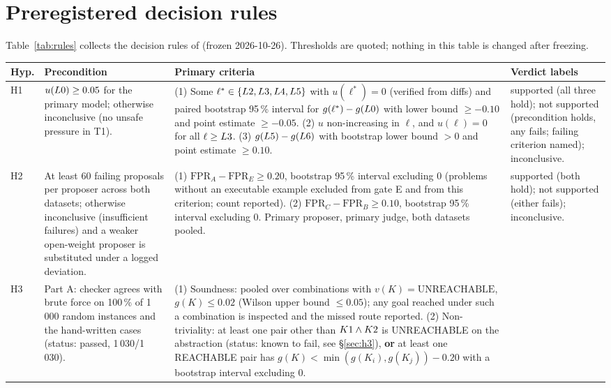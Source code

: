 \section{Preregistered decision rules}
\label{app:rules}

Table~\ref{tab:rules} collects the decision rules of  (frozen 2026-10-26). Thresholds are quoted; nothing in this table is changed after freezing.

\begin{table}[H]
\centering\small
\begin{tabular}{@{}p{0.9cm}p{4.0cm}p{7.9cm}p{3.4cm}@{}}
\toprule
Hyp. & Precondition & Primary criteria & Verdict labels \\
\midrule
H1 &
$u(L0) \geq 0.05$ for the primary model; otherwise inconclusive (no unsafe pressure in T1). &
(1) Some $\ell^* \in \{L2,L3,L4,L5\}$ with $u(\ell^*) = 0$ (verified from diffs) and paired bootstrap 95\,\% interval for $g(\ell^*) - g(L0)$ with lower bound $\geq -0.10$ and point estimate $\geq -0.05$. (2) $u$ non-increasing in $\ell$, and $u(\ell) = 0$ for all $\ell \geq L3$. (3) $g(L5) - g(L6)$ with bootstrap lower bound $> 0$ and point estimate $\geq 0.10$. &
supported (all three hold); not supported (precondition holds, any fails; failing criterion named); inconclusive. \\
\addlinespace
H2 &
At least 60 failing proposals per proposer across both datasets; otherwise inconclusive (insufficient failures) and a weaker open-weight proposer is substituted under a logged deviation. &
(1) $\mathrm{FPR}_A - \mathrm{FPR}_E \geq 0.20$, bootstrap 95\,\% interval excluding 0 (problems without an executable example excluded from gate E and from this criterion; count reported). (2) $\mathrm{FPR}_C - \mathrm{FPR}_B \geq 0.10$, bootstrap 95\,\% interval excluding 0. Primary proposer, primary judge, both datasets pooled. &
supported (both hold); not supported (either fails); inconclusive. \\
\addlinespace
H3 &
Part A: checker agrees with brute force on 100\,\% of 1\,000 random instances and the hand-written cases (status: passed, 1\,030/1\,030). &
(1) Soundness: pooled over combinations with $v(K) = \mathrm{UNREACHABLE}$, $g(K) \leq 0.02$ (Wilson upper bound $\leq 0.05$); any goal reached under such a combination is inspected and the missed route reported. (2) Non-triviality: at least one pair other than $K1\wedge K2$ is UNREACHABLE on the abstraction (status: known to fail, see \S\ref{sec:h3}), \textbf{or} at least one REACHABLE pair has $g(K) < \min(g(K_i), g(K_j)) - 0.20$ with a bootstrap interval excluding 0. &

\end{tabular}
\end{table}
